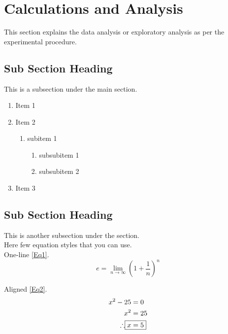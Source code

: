 
\section{Calculations and Analysis}

This section explains the data analysis or exploratory analysis as per the experimental procedure.  


\subsection{Sub Section Heading}
This is a subsection under the main section.

\begin{enumerate}
    \item Item 1
    \item Item 2
    \begin{enumerate}
        \item subitem 1
        \begin{enumerate}
            \item subsubitem 1
            \item subsubitem 2
        \end{enumerate}
    \end{enumerate}
    \item Item 3
\end{enumerate}

\subsection{Sub Section Heading}
This is another subsection under the section.\\

Here few equation styles that you can use.\\

One-line \cref{Eq1}.
\begin{equation}
e = \lim_{n\to\infty} \left(1+\frac{1}{n}\right)^n
\label{Eq1}
\end{equation} 

Aligned \cref{Eq2}.
\begin{align}
	x^2 -25 &= 0 \nonumber \\
	x^2 &= 25 \nonumber \\
	\therefore \Aboxed{x &= 5}
 \label{Eq2}
\end{align}

